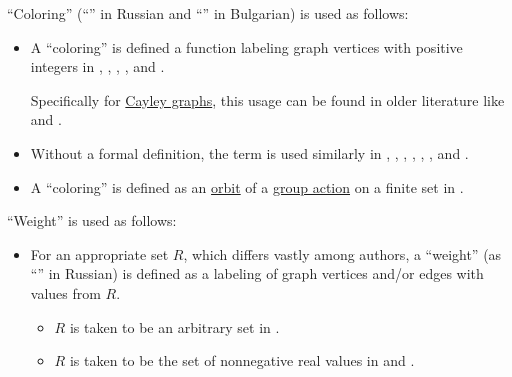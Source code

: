 \begin{remark}
\begin{thmenum}
     \enquote{Coloring} (\enquote{} in Russian and \enquote{} in Bulgarian) is used as follows:
    \begin{itemize}
      \item A \enquote{coloring} is defined a function labeling graph vertices with positive integers in
      \cite[395]{Erickson2019Algorithms},
      \cite[\S 2.5.4]{Harzheim2005OrderedSets},
      \cite[124]{Aigner1997CombinatorialTheory},
      \cite[28]{Зыков2004ТеорияГрафов},
      \cite[235]{ЕмеличевИПр1990ТеорияГрафов} and
      \cite[\S 10.7.1]{Новиков2013ДискретнаяМатематика}.

      Specifically for \hyperref[def:cayley_graph]{Cayley graphs}, this usage can be found in older literature like
      \cite[174]{Cayley1878Graphs} and
      \cite[156]{König1990GraphTheory}.

      \item Without a formal definition, the term is used similarly in
      \cite[7]{Birkhoff1967LatticeTheory},
      \cite[145]{Bollobás1998ModernGraphTheory},
      \cite[139]{Knauer2019AlgebraicGraphTheory},
      \cite[500]{Jacobson1985BasicAlgebraI},
      \cite{Stanley2012EnumerativeCombinatoricsVol1},
      \cite{Rosen2019DiscreteMathematics},
      \cite{БарановСтечкин2004ЭкстремальнаяКомбинаторика} and
      \cite[141]{Мирчев2001Графи}.

      \item A \enquote{coloring} is defined as an \hyperref[def:group_action_orbit]{orbit} of a \hyperref[def:group_action]{group action} on a finite set in \cite[21]{Rotman2017AdvancedModernAlgebraPart2}.
    \end{itemize}

     \enquote{Weight} is used as follows:
    \begin{itemize}
      \item For an appropriate set \( R \), which differs vastly among authors, a \enquote{weight} (as \enquote{} in Russian) is defined as a labeling of graph vertices and/or edges with values from \( R \).

      \begin{itemize}
        \item \( R \) is taken to be an arbitrary set in
        \cite[def. 1.1.2]{Knauer2019AlgebraicGraphTheory}.

        \item \( R \) is taken to be the set of nonnegative real values in
        \cite[exerc. 8.4]{Новиков2013ДискретнаяМатематика} and
        \cite[59]{ЕмеличевИПр1990ТеорияГрафов}.


\end{itemize}
\end{itemize}
\end{thmenum}
\end{remark}
